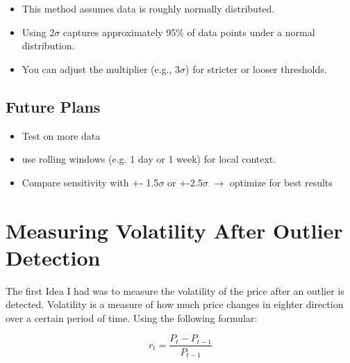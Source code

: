 \documentclass[12pt]{article}
\begin{document}
\begin{itemize}
    \item This method assumes data is roughly normally distributed.
    \item Using $2\sigma$ captures approximately 95\% of data points under a normal distribution.
    \item You can adjust the multiplier (e.g., $3\sigma$) for stricter or looser thresholds.
\end{itemize}





\subsection{Future Plans}

\begin{itemize}
    \item Test on more data
    \item use rolling windows (e.g. 1 day or 1 week) for local context.
    \item Compare sensitivity with +- 1.5$\sigma$ or +-2.5$\sigma$ $\rightarrow$ optimize for best results
\end{itemize}
















\newpage





\section{Measuring Volatility After Outlier Detection}

The first Idea I had was to measure the volatility of the price after an outlier is detected. Volatility is a measure of how much price changes in eighter direction over a certain period of time. 
Using the following formular:








\begin{equation}\label{eq:price_return}
    r_t = \frac{P_{t} - P_{t-1}}{P_{t-1}}
\end{equation}
\end{document}
